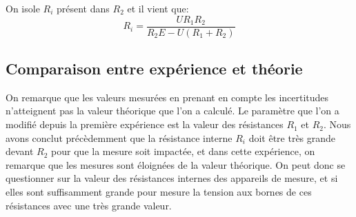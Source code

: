 \documentclass[10pt]{article}
\begin{document}
On isole $R_i$ présent dans $R_2$ et il vient que:
\begin{equation}
    R_i = \frac{U R_1 R_2}{R_2 E - U (R_1 + R_2)}
\end{equation}

\subsection{Comparaison entre expérience et théorie}
On remarque que les valeurs mesurées en prenant en compte les incertitudes n'atteignent pas la valeur théorique que l'on a calculé.
Le paramètre que l'on a modifié depuis la première expérience est la valeur des résistances $R_1$ et $R_2$. 
Nous avons conclut précèdemment que la résistance interne $R_i$ doit être très grande devant $R_2$ pour que la mesure soit impactée,
et dans cette expérience, on remarque que les mesures sont éloignées de la valeur théorique. 
On peut donc se questionner sur la valeur des résistances internes des appareils de mesure, et si elles sont suffisamment grande
pour mesure la tension aux bornes de ces résistances avec une très grande valeur.
\end{document}
